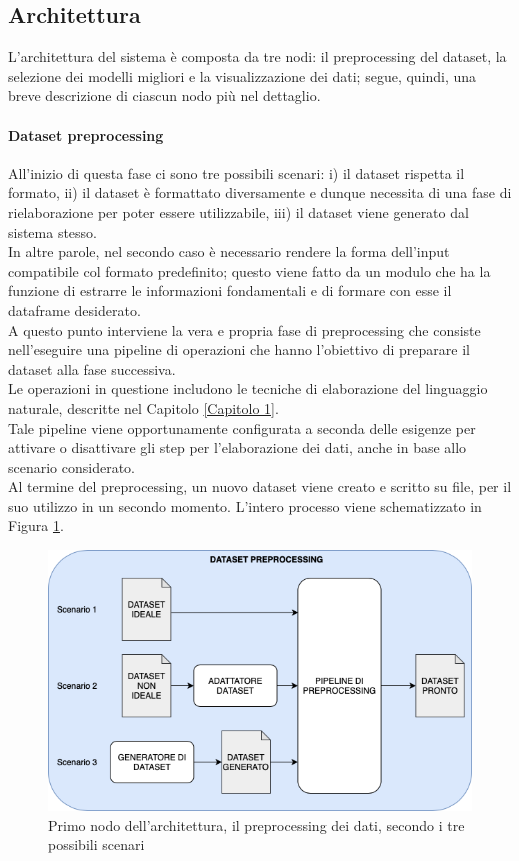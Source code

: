 \documentclass[12pt]{report}
\theoremstyle{definition}
\begin{document}
\subsection{Architettura}
L'architettura del sistema è composta da tre nodi: il preprocessing del dataset, la selezione dei modelli migliori e la visualizzazione dei dati; segue, quindi, una breve descrizione di ciascun nodo più nel dettaglio.

\paragraph{Dataset preprocessing} All'inizio di questa fase ci sono tre possibili scenari: i) il dataset rispetta il formato, ii) il dataset è formattato diversamente e dunque necessita di una fase di rielaborazione per poter essere utilizzabile, iii) il dataset viene generato dal sistema stesso.
\\
In altre parole, nel secondo caso è necessario rendere la forma dell'input compatibile col formato predefinito; questo viene fatto da un modulo che ha la funzione di estrarre le informazioni fondamentali e di formare con esse il dataframe desiderato.
\\
A questo punto interviene la vera e propria fase di preprocessing che consiste nell'eseguire una pipeline di operazioni che hanno l'obiettivo di preparare il dataset alla fase successiva.
\\
Le operazioni in questione includono le tecniche di elaborazione del linguaggio naturale, descritte nel Capitolo \ref{Capitolo 1}.
\\
Tale pipeline viene opportunamente configurata a seconda delle esigenze per attivare o disattivare gli step per l'elaborazione dei dati, anche in base allo scenario considerato.
\\
Al termine del preprocessing, un nuovo dataset viene creato e scritto su file, per il suo utilizzo in un secondo momento. L'intero processo viene schematizzato in Figura \ref{preprocessmodule}.

\begin{figure}
    \centering
    \includegraphics[scale=0.6]{images/preprocessingmodule.png}
    \caption{Primo nodo dell'architettura, il preprocessing dei dati, secondo i tre possibili scenari}
    \label{preprocessmodule}
\end{figure}
\end{document}
